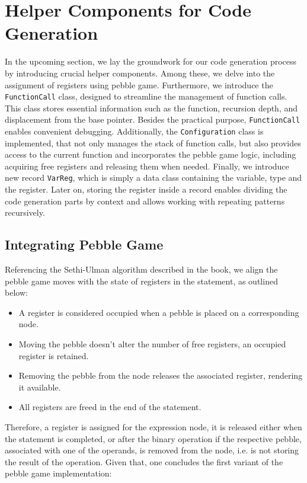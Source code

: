 \section{Helper Components for Code Generation}\label{sec:helpers}
In the upcoming section, we lay the groundwork for our code generation process by introducing crucial
helper components. Among these, we delve into the assignment of registers using pebble game. Furthermore, we
introduce the \verb+FunctionCall+ class, designed to streamline the management of function calls. This class stores
essential information such as the function, recursion depth, and displacement from the base pointer. Besides the practical
purpose, \verb+FunctionCall+ enables convenient debugging. Additionally, the \verb+Configuration+ class is implemented, that
not only manages the stack of function calls, but also provides access to the current function and incorporates the pebble game
logic, including acquiring free registers and releasing them when needed. Finally, we introduce new record \verb+VarReg+, which is
simply a data class containing the variable, type and the register. Later on, storing the register inside a record enables
dividing the code generation parts by context and allows working with repeating patterns recursively.
\subsection{Integrating Pebble Game}
Referencing the Sethi-Ulman algorithm described in the book, we align the pebble game moves with the state of registers in the statement,
as outlined below:
\begin{itemize}
    \item A register is considered occupied when a pebble is placed on a corresponding node.
    \item Moving the pebble doesn't alter the number of free registers, an occupied register is retained.
    \item Removing the pebble from the node releases the associated register, rendering it available.
    \item All registers are freed in the end of the statement.
\end{itemize}
Therefore, a register is assigned for the expression node, it is released either when the statement is completed, or after
the binary operation if the respective pebble, associated with one of the operands, is removed from the node, i.e. is not
storing the result of the operation. Given that, one concludes the first variant of the pebble game implementation:
